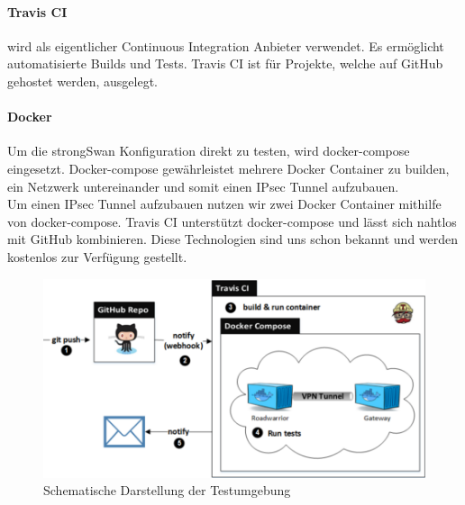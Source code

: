 \paragraph{Travis CI} wird als eigentlicher Continuous Integration Anbieter verwendet. Es ermöglicht automatisierte Builds und Tests. Travis CI ist für Projekte, welche auf GitHub gehostet werden, ausgelegt.

\paragraph{Docker} Um die strongSwan Konfiguration direkt zu testen, wird docker-compose eingesetzt. Docker-compose gewährleistet mehrere Docker Container zu builden, ein Netzwerk untereinander und somit einen IPsec Tunnel aufzubauen. \\
Um einen IPsec Tunnel aufzubauen nutzen wir zwei Docker Container mithilfe von docker-compose. Travis CI unterstützt docker-compose und lässt sich nahtlos mit GitHub kombinieren. Diese Technologien sind uns schon bekannt und werden kostenlos zur Verfügung gestellt.\\

\begin{figure}[H]
\centering
\includegraphics[width=420pt]{images/testing.png}
\caption[Schematische Darstellung der Testumgebung]{Schematische Darstellung der Testumgebung}
\end{figure}\medskip
